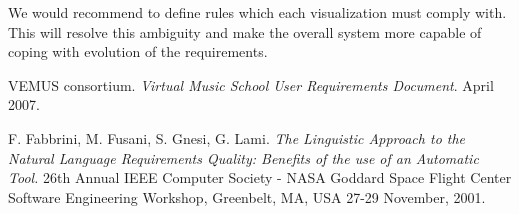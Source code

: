 \documentclass[a4paper,twoside, twocolumn,11pt]{article}
\numberwithin{equation}{section}
\begin{document}
We would recommend to define rules which each visualization must comply with. This will resolve this ambiguity and make the overall system more capable of coping with evolution of the requirements.

\begin{thebibliography}{9}
VEMUS consortium. \emph{Virtual Music School User Requirements Document}.
April 2007.

F. Fabbrini, M. Fusani, S. Gnesi, G. Lami. \emph{The Linguistic Approach to the Natural Language Requirements Quality: Benefits of the use of an Automatic Tool.} 26th Annual IEEE Computer Society - NASA Goddard Space Flight Center Software Engineering Workshop, Greenbelt, MA, USA 27-29 November, 2001.
\end{thebibliography}
\end{document}
